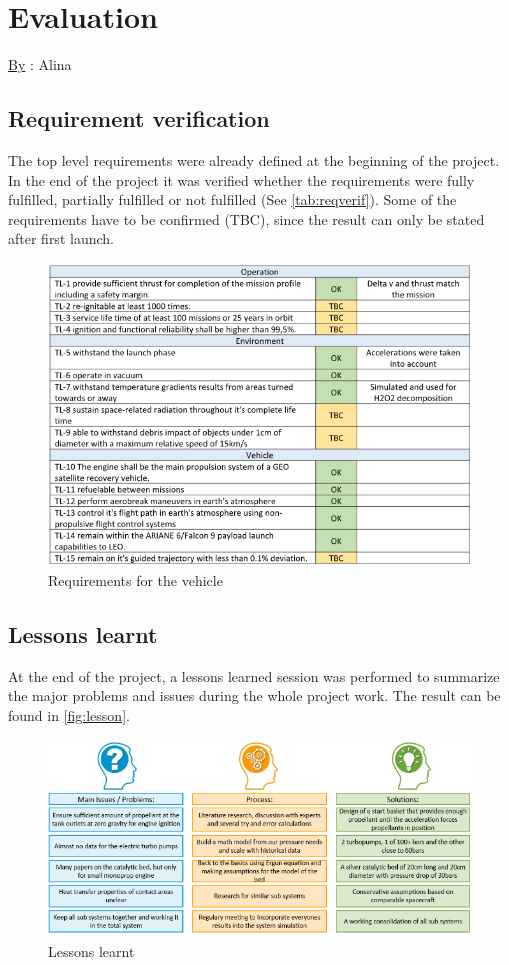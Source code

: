 \chapter{Evaluation}
\qquad \underline{By} : Alina
\section{Requirement verification}
The top level requirements were already defined at the beginning of the project. In the end of the project it was verified whether the requirements were fully fulfilled, partially fulfilled or not fulfilled (See \autoref{tab:reqverif}). Some of the requirements have to be confirmed (TBC), since the result can only be stated after first launch.
\begin{figure}[H]
	\centering
	\includegraphics[width=0.8\linewidth]{reqveh}
	\caption{Requirements for the vehicle}\label{tab:reqverif}
\end{figure}

\section{Lessons learnt}
At the end of the project, a lessons learned session was performed to summarize the major problems and issues
during the whole project work. The result can be found in \autoref{fig:lesson}.
\begin{figure}[H]
	\centering
	\includegraphics[width=\linewidth]{lessonlearnt}
	\caption{Lessons learnt}\label{fig:lesson}
\end{figure}